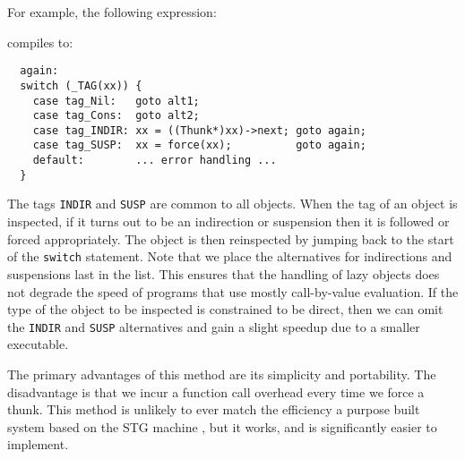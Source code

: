 For example, the following expression:


compiles to:

\begin{lstlisting}
  again:
  switch (_TAG(xx)) {
    case tag_Nil:   goto alt1;
    case tag_Cons:  goto alt2;
    case tag_INDIR: xx = ((Thunk*)xx)->next; goto again;
    case tag_SUSP:  xx = force(xx);          goto again;
    default:        ... error handling ...
  }
\end{lstlisting}

The tags \texttt{INDIR} and \texttt{SUSP} are common to all objects. When the tag of an object is inspected, if it turns out to be an indirection or suspension then it is followed or forced appropriately. The object is then reinspected by jumping back to the start of the \texttt{switch} statement. Note that we place the alternatives for indirections and suspensions last in the list. This ensures that the handling of lazy objects does not degrade the speed of programs that use mostly call-by-value evaluation. If the type of the object to be inspected is constrained to be direct, then we can omit the \texttt{INDIR} and \texttt{SUSP} alternatives and gain a slight speedup due to a smaller executable.

The primary advantages of this method are its simplicity and portability. The disadvantage is that we incur a function call overhead every time we force a thunk. This method is unlikely to ever match the efficiency a purpose built system based on the STG machine \cite{peyton-jones:g-machine}, but it works, and is significantly easier to implement.


